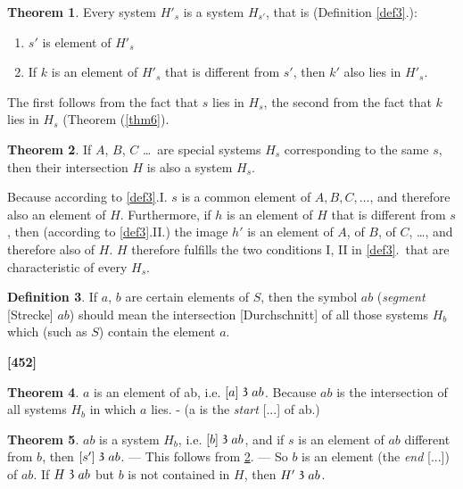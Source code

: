 \documentclass[leqno]{article}
\theoremstyle{definition}
\newtheorem{theorem}{Theorem}
\newtheorem{definition}[theorem]{Definition}
\newcommand\partof{\mathrel{\raisebox{0.45ex}{$\mathfrak{3}$}}}
\begin{document}
\begin{theorem}\label{thm7}
Every system $H'_s$ is a system $H_{s'}$, that is (Definition \ref{def3}.):
\begin{enumerate}[I'.]
	\item $s'$ is element of $H'_s$
	\item If $k$ is an element of $H'_s$ that is different from $s'$, then $k'$ also lies in $H'_s$.
\end{enumerate}\end{theorem}

The first follows from the fact that $s$ lies in $H_s$, the second from the fact that $k$ lies in $H_s$ (Theorem (\ref{thm6}).

\begin{theorem}\label{thm8}
If $A$, $B$, $C$ \ldots\ are special systems $H_s$ corresponding to the same $s$, then their intersection $H$ is also a system $H_s$.\end{theorem}

Because according to \ref{def3}.I. $s$ is a common element of $A, B, C, \ldots$, and therefore also an element of $H$. 
Furthermore, if $h$ is an element of $H$ that is different from $s$, then (according to \ref{def3}.II.) the image $h'$ is an element of $A$, of $B$, of $C$, \ldots, and therefore also of $H$. 
$H$ therefore fulfills the two conditions I, II in \ref{def3}.\ that are characteristic of every $H_s$.

\begin{definition}\label{def9}
If $a$, $b$ are certain elements of $S$, then the symbol $ab$ (\emph{segment} [Strecke] $ab$) should mean the intersection [Durchschnitt] of all those systems $H_b$  which (such as $S$) contain the element $a$.
\end{definition}

\noindent \textbf{[452]}

\begin{theorem}\label{thm10}
$a$ is an element of ab, i.e. $[a] \partof ab$. Because $ab$ is the intersection of all systems $H_b$ in which $a$ lies. - (a is the \emph{start} [...] of ab.)
\end{theorem}

\begin{theorem}\label{thm11}
$ab$ is a system $H_b$, i.e. $[b] \partof ab$, and if $s$ is an element of $ab$ different from $b$, then $[s'] \partof ab$.
--- This follows from \ref{thm8}. --- So $b$ is an element (the \emph{end} [...]) of $ab$. If $H \partof ab$ but $b$ is not contained in $H$, then $H' \partof ab$. 
\end{theorem} 
\end{document}
